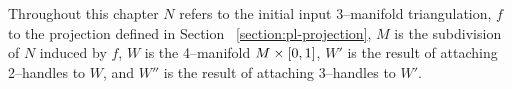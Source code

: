 Throughout this chapter $N$ refers to the initial input 3--manifold triangulation, $f$ to the projection defined in Section ~\ref{section:pl-projection}, $M$ is the subdivision of $N$ induced by $f$, $W$ is the 4--manifold $M\times[0,1]$, $W'$ is the result of attaching 2--handles to $W$, and $W''$ is the result of attaching 3--handles to $W'$.













